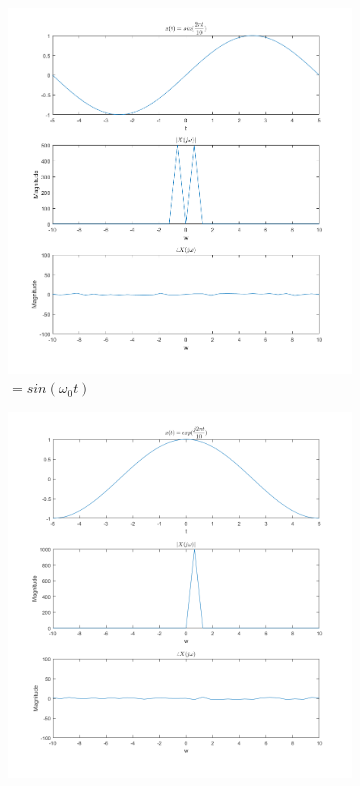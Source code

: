 \documentclass[11pt]{article}
\begin{document}
\begin{figure}
\centering
\begin{subfigure}[b]{.3\linewidth}
\includegraphics[width=\linewidth]{q2a}
\caption{$ = sin(\omega _{0}t)$}
\end{subfigure}
\begin{subfigure}[b]{.3\linewidth}
\includegraphics[width=\linewidth]{q2b}

\end{subfigure}
\end{figure}
\end{document}

